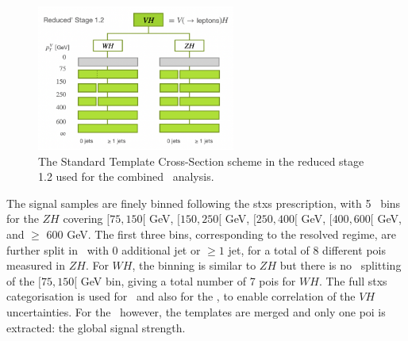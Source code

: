   \begin{figure}[!htbp]
    \centering
    \includegraphics[width=0.58\textwidth]{Images/VH/Model/STXSsketch.png}
    \caption{The Standard Template Cross-Section scheme in the reduced stage 1.2 used for the combined \vhbc\ analysis.}
    \label{fig:model-stxsscheme}
  \end{figure}

The signal samples are finely binned following the \gls{stxs} prescription, with 5 \ptv\ bins for the $ZH$ covering $[75, 150[$ GeV, $[150, 250[$ GeV, $[250, 400[$ GeV, $[400, 600[$ GeV, and $\geq$ 600 GeV. The first three bins, corresponding to the resolved regime, are further split in \nj\ with 0 additional jet or $\geq 1$ jet, for a total of 8 different \glspl{poi} measured in $ZH$. For $WH$, the binning is similar to $ZH$ but there is no \nj\ splitting of the $[75, 150[$ GeV bin, giving a total number of 7 \glspl{poi} for $WH$. The full \gls{stxs} categorisation is used for \vhb\ and also for the \vhc, to enable correlation of the $VH$ uncertainties. For the \vhc\ however, the templates are merged and only one \gls{poi} is extracted: the global signal strength.\\
  
